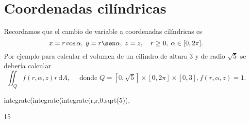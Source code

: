 
\section{Coordenadas cilíndricas}
Recordamos que el cambio de variable a coordenadas cilíndricas es
\begin{equation*}
 x=r\cos\alpha,
 \;
 y=r\sen\alpha,
 \;
 z=z,
 \quad
 r\geq0,
 \;
 \alpha\in[0,2\pi].
\end{equation*}
Por ejemplo para calcular el volumen de un cilindro de altura $3$
y de radio $\sqrt{5}$
se debería calcular
\begin{equation*}
 \iint_{Q} f(r,\alpha,z)r\,\mathrm{d}A,
 \quad
 \text{ donde }
 Q = [0,\sqrt{5}]\times[0,2\pi]\times[0,3],
 f(r,\alpha,z) = 1.
\end{equation*}
\begin{maximai}
 integrate(integrate(integrate(r,r,0,sqrt(5)), %
\end{maximai}\begin{maximao}
 15\pi
\end{maximao}
